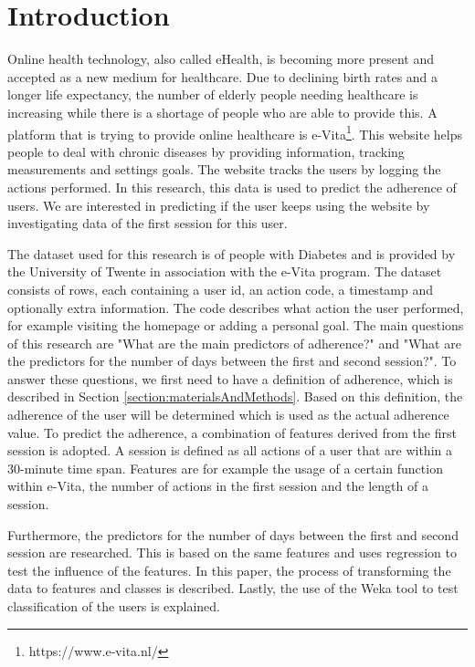 \section{Introduction}
Online health technology, also called eHealth, is becoming more present and accepted as a new medium for healthcare. Due to declining birth rates and a longer life expectancy, the number of elderly people needing healthcare is increasing while there is a shortage of people who are able to provide this. A platform that is trying to provide online healthcare is e-Vita\footnote{https://www.e-vita.nl/}. This website helps people to deal with chronic diseases by providing information, tracking measurements and settings goals. The website tracks the users by logging the actions performed. In this research, this data is used to predict the adherence of users. We are interested in predicting if the user keeps using the website by investigating data of the first session for this user.

The dataset used for this research is of people with Diabetes and is provided by the University of Twente in association with the e-Vita program. The dataset consists of rows, each containing a user id, an action code, a timestamp and optionally extra information. The code describes what action the user performed, for example visiting the homepage or adding a personal goal. The main questions of this research are "What are the main predictors of adherence?" and "What are the predictors for the number of days between the first and second session?". To answer these questions, we first need to have a definition of adherence, which is described in Section \ref{section:materialsAndMethods}. Based on this definition, the adherence of the user will be determined which is used as the actual adherence value. To predict the adherence, a combination of features derived from the first session is adopted. A session is defined as all actions of a user that are within a 30-minute time span. Features are for example the usage of a certain function within e-Vita, the number of actions in the first session and the length of a session.

Furthermore, the predictors for the number of days between the first and second session are researched. This is based on the same features and uses regression to test the influence of the features. In this paper, the process of transforming the data to features and classes is described. Lastly, the use of the Weka \cite{weka} tool to test classification of the users is explained.